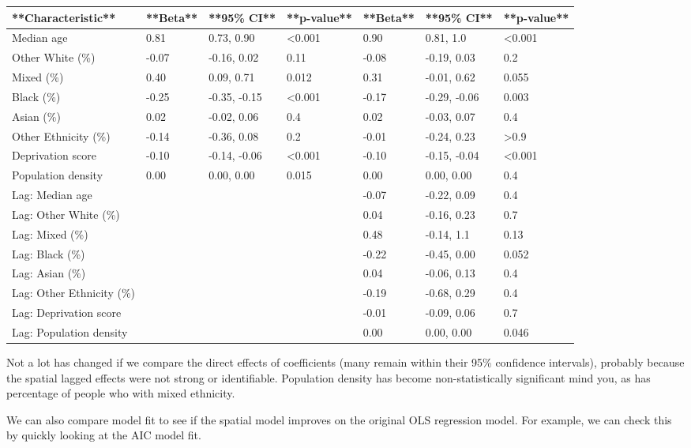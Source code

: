 \documentclass[
]{book}
\begin{document}
\begin{tabular}{l|l|l|l|l|l|l}
\hline
**Characteristic** & **Beta** & **95\% CI** & **p-value** & **Beta** & **95\% CI** & **p-value**\\
\hline
Median age & 0.81 & 0.73, 0.90 & <0.001 & 0.90 & 0.81, 1.0 & <0.001\\
\hline
Other White (\%) & -0.07 & -0.16, 0.02 & 0.11 & -0.08 & -0.19, 0.03 & 0.2\\
\hline
Mixed (\%) & 0.40 & 0.09, 0.71 & 0.012 & 0.31 & -0.01, 0.62 & 0.055\\
\hline
Black (\%) & -0.25 & -0.35, -0.15 & <0.001 & -0.17 & -0.29, -0.06 & 0.003\\
\hline
Asian (\%) & 0.02 & -0.02, 0.06 & 0.4 & 0.02 & -0.03, 0.07 & 0.4\\
\hline
Other Ethnicity (\%) & -0.14 & -0.36, 0.08 & 0.2 & -0.01 & -0.24, 0.23 & >0.9\\
\hline
Deprivation score & -0.10 & -0.14, -0.06 & <0.001 & -0.10 & -0.15, -0.04 & <0.001\\
\hline
Population density & 0.00 & 0.00, 0.00 & 0.015 & 0.00 & 0.00, 0.00 & 0.4\\
\hline
Lag: Median age &  &  &  & -0.07 & -0.22, 0.09 & 0.4\\
\hline
Lag: Other White (\%) &  &  &  & 0.04 & -0.16, 0.23 & 0.7\\
\hline
Lag: Mixed (\%) &  &  &  & 0.48 & -0.14, 1.1 & 0.13\\
\hline
Lag: Black (\%) &  &  &  & -0.22 & -0.45, 0.00 & 0.052\\
\hline
Lag: Asian (\%) &  &  &  & 0.04 & -0.06, 0.13 & 0.4\\
\hline
Lag: Other Ethnicity (\%) &  &  &  & -0.19 & -0.68, 0.29 & 0.4\\
\hline
Lag: Deprivation score &  &  &  & -0.01 & -0.09, 0.06 & 0.7\\
\hline
Lag: Population density &  &  &  & 0.00 & 0.00, 0.00 & 0.046\\
\hline
\end{tabular}

Not a lot has changed if we compare the direct effects of coefficients (many remain within their 95\% confidence intervals), probably because the spatial lagged effects were not strong or identifiable. Population density has become non-statistically significant mind you, as has percentage of people who with mixed ethnicity.

We can also compare model fit to see if the spatial model improves on the original OLS regression model. For example, we can check this by quickly looking at the AIC model fit.
\end{document}
